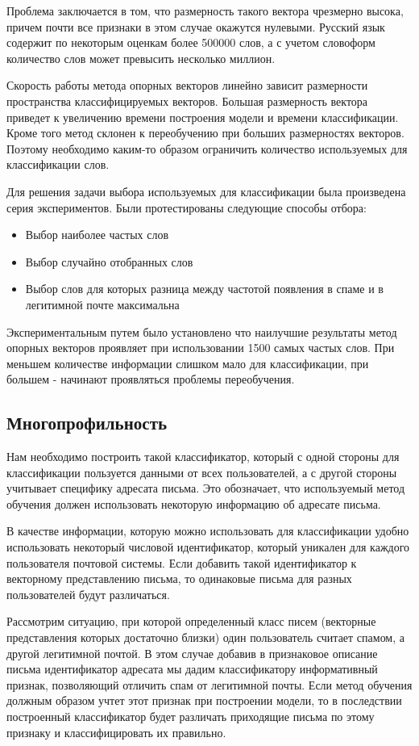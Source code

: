 Проблема заключается в том, что размерность такого вектора чрезмерно высока, причем
почти все признаки в этом случае окажутся нулевыми. Русский язык содержит по некоторым оценкам более 500000\cite{TUTIN} слов, а с
учетом словоформ количество слов может превысить несколько миллион.

Скорость работы метода опорных векторов линейно зависит размерности пространства классифицируемых векторов.
Большая размерность вектора приведет к увеличению времени построения модели и времени классификации.
Кроме того метод склонен к переобучению при больших размерностях векторов. Поэтому необходимо каким-то образом ограничить количество используемых для классификации слов.

Для решения задачи выбора используемых для классификации была произведена серия экспериментов.
Были протестированы следующие способы отбора:
\begin{itemize}
\item Выбор наиболее частых слов
\item Выбор случайно отобранных слов
\item Выбор слов для которых разница между частотой появления в спаме и в легитимной почте максимальна
\end{itemize}

Экспериментальным путем было установлено что наилучшие результаты метод опорных векторов проявляет при использовании 1500 самых частых слов. При меньшем количестве информации слишком мало для классификации, при большем - начинают проявляться проблемы переобучения.

\subsection{Многопрофильность}
\label{MULTIPROFILE}
Нам необходимо построить такой классификатор, который с одной стороны для классификации пользуется данными от  всех пользователей, а с другой стороны учитывает специфику адресата письма.  Это обозначает, что используемый метод обучения должен использовать некоторую информацию об адресате письма. 

В качестве информации, которую можно использовать для классификации удобно использовать некоторый числовой идентификатор, который уникален для каждого пользователя почтовой системы. Если добавить такой идентификатор к векторному представлению письма, то одинаковые письма для разных пользователей будут различаться. 

Рассмотрим ситуацию, при которой определенный класс писем (векторные представления которых достаточно близки) один пользователь считает спамом, а другой легитимной почтой.  В этом случае добавив в признаковое описание письма идентификатор адресата мы дадим классификатору информативный признак, позволяющий отличить спам от легитимной почты. Если метод обучения должным образом учтет этот признак при построении модели, то в последствии построенный классификатор будет различать приходящие письма по этому признаку и классифицировать их правильно. 

